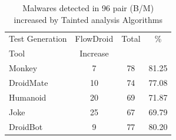 \begin{table}[ht]
\centering
\begin{tabular}{lccc}\toprule
 Test Generation & FlowDroid & Total & \%\\
 Tool & Increase  &  & \\ \midrule
 Monkey & 7 & 78 & 81.25\\
 DroidMate & 10 &  74 & 77.08 \\
 Humanoid & 20 & 69 & 71.87  \\
 Joke & 25 & 67 & 69.79 \\
 DroidBot & 9 & 77 & 80.20  \\\midrule
 
\end{tabular} 
\caption{Malwares detected in 96 pair (B/M) increased by Tainted analysis Algorithms}
\label{tab:tanted}
\end{table}



